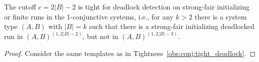 \begin{tightness} \label{obs:conj:tight_deadlock_fair}
The cutoff $c=2|B|-2$ is tight for deadlock detection on strong-fair initializing
or finite runs in the 1-conjunctive systems, 
i.e., 
for any $k>2$ there is a system type $(A,B)$ with $|B|=k$ such that 
there is a strong-fair initializing deadlocked run in $(A,B)^{(1,2|B|-2)}$, 
but not in $(A,B)^{(1,2|B|-3)}$.
\end{tightness} 
\begin{proof} 
Consider the same templates as in Tightness~\ref{obs:conj:tight_deadlock}.
%
\end{proof}

